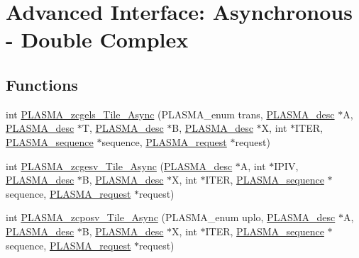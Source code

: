 \hypertarget{group__PLASMA__Complex64__t__Tile__Async}{}\section{Advanced Interface\+: Asynchronous -\/ Double Complex}
\label{group__PLASMA__Complex64__t__Tile__Async}
\subsection*{Functions}
\begin{DoxyCompactItemize}
\item 
int \hyperlink{group__PLASMA__Complex64__t__Tile__Async_ga996b201266467b1742e9797eea79130d_ga996b201266467b1742e9797eea79130d}{P\+L\+A\+S\+M\+A\+\_\+zcgels\+\_\+\+Tile\+\_\+\+Async} (P\+L\+A\+S\+M\+A\+\_\+enum trans, \hyperlink{structplasma__desc__t}{P\+L\+A\+S\+M\+A\+\_\+desc} $\ast$A, \hyperlink{structplasma__desc__t}{P\+L\+A\+S\+M\+A\+\_\+desc} $\ast$T, \hyperlink{structplasma__desc__t}{P\+L\+A\+S\+M\+A\+\_\+desc} $\ast$B, \hyperlink{structplasma__desc__t}{P\+L\+A\+S\+M\+A\+\_\+desc} $\ast$X, int $\ast$I\+T\+E\+R, \hyperlink{structplasma__sequence__t}{P\+L\+A\+S\+M\+A\+\_\+sequence} $\ast$sequence, \hyperlink{structplasma__request__t}{P\+L\+A\+S\+M\+A\+\_\+request} $\ast$request)
\item 
int \hyperlink{group__PLASMA__Complex64__t__Tile__Async_ga951cf5fa265511341d92979d9ca86613_ga951cf5fa265511341d92979d9ca86613}{P\+L\+A\+S\+M\+A\+\_\+zcgesv\+\_\+\+Tile\+\_\+\+Async} (\hyperlink{structplasma__desc__t}{P\+L\+A\+S\+M\+A\+\_\+desc} $\ast$A, int $\ast$I\+P\+I\+V, \hyperlink{structplasma__desc__t}{P\+L\+A\+S\+M\+A\+\_\+desc} $\ast$B, \hyperlink{structplasma__desc__t}{P\+L\+A\+S\+M\+A\+\_\+desc} $\ast$X, int $\ast$I\+T\+E\+R, \hyperlink{structplasma__sequence__t}{P\+L\+A\+S\+M\+A\+\_\+sequence} $\ast$sequence, \hyperlink{structplasma__request__t}{P\+L\+A\+S\+M\+A\+\_\+request} $\ast$request)
\item 
int \hyperlink{group__PLASMA__Complex64__t__Tile__Async_gad582515d56a856b1d1477dbfac676a40_gad582515d56a856b1d1477dbfac676a40}{P\+L\+A\+S\+M\+A\+\_\+zcposv\+\_\+\+Tile\+\_\+\+Async} (P\+L\+A\+S\+M\+A\+\_\+enum uplo, \hyperlink{structplasma__desc__t}{P\+L\+A\+S\+M\+A\+\_\+desc} $\ast$A, \hyperlink{structplasma__desc__t}{P\+L\+A\+S\+M\+A\+\_\+desc} $\ast$B, \hyperlink{structplasma__desc__t}{P\+L\+A\+S\+M\+A\+\_\+desc} $\ast$X, int $\ast$I\+T\+E\+R, \hyperlink{structplasma__sequence__t}{P\+L\+A\+S\+M\+A\+\_\+sequence} $\ast$sequence, \hyperlink{structplasma__request__t}{P\+L\+A\+S\+M\+A\+\_\+request} $\ast$request)

\end{DoxyCompactItemize}
